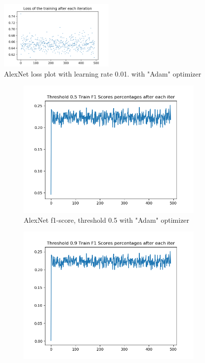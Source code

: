 \begin{figure}[!ht]
\centering
\includegraphics[width=0.5\textwidth]{alexnet-lazy-adam-1_0-train-loss.png}
\caption{\label{alexnet:alexnet-lazy-adam-1_0-train-loss}AlexNet loss plot with learning rate 0.01. with "Adam" optimizer}
\end{figure}

\begin{figure}[!ht]
\centering
\begin{subfigure}{.5\textwidth}
	\centering
	\includegraphics[width=1\linewidth]{alexnet-lazy-adam-1_0-train-scores-f1-5.png}
	\caption{\label{alexnet:alexnet-adam-lazy-1_0-train-scores-f1-5}AlexNet f1-score, threshold 0.5 with "Adam" optimizer}
\end{subfigure}%
\begin{subfigure}{.5\textwidth}
	\centering
	\includegraphics[width=1\linewidth]{alexnet-lazy-adam-1_0-train-scores-f1-9.png}

\end{subfigure}
\end{figure}
